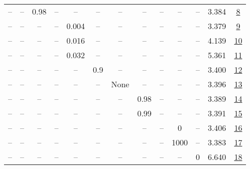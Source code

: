 \begin{table}[H]
\begin{tabular}{ccccccccccccc}
-- & -- & 0.98 & -- & -- & -- & -- & -- & -- & -- & -- & 3.384 & \href{https://wandb.ai/stanford-mercury/optimizer-scaling/runs/sweep-130m-5B-mudamhe3b8b9lr0.008-alr0.008-wd0.2-minlr0-warmup50-489087}{8} \\
-- & -- & -- & -- & 0.004 & -- & -- & -- & -- & -- & -- & 3.379 & \href{https://wandb.ai/stanford-mercury/optimizer-scaling/runs/sweep-130m-5B-mudamhf5aa1clr0.004-alr0.008-wd0.2-minlr0-warmup50-3f0db1}{9} \\
-- & -- & -- & -- & 0.016 & -- & -- & -- & -- & -- & -- & 4.139 & \href{https://wandb.ai/stanford-mercury/optimizer-scaling/runs/sweep-130m-5B-mudamxd71e9blr0.016-alr0.008-wd0.2-minlr0-warmup50-941b3c}{10} \\
-- & -- & -- & -- & 0.032 & -- & -- & -- & -- & -- & -- & 5.361 & \href{https://wandb.ai/stanford-mercury/optimizer-scaling/runs/sweep-130m-5B-mudamh671c15lr0.032-alr0.008-wd0.2-minlr0-warmup50-1b93b8}{11} \\
-- & -- & -- & -- & -- & 0.9 & -- & -- & -- & -- & -- & 3.400 & \href{https://wandb.ai/stanford-mercury/optimizer-scaling/runs/sweep-130m-5B-mudamhec585dlr0.008-alr0.008-wd0.2-minlr0-warmup50-8915fe}{12} \\
-- & -- & -- & -- & -- & -- & None & -- & -- & -- & -- & 3.396 & \href{https://wandb.ai/stanford-mercury/optimizer-scaling/runs/sweep-130m-5B-mudamhfba204lr0.008-alr0.008-wd0.2-minlr0-warmup50-229ac2}{13} \\
-- & -- & -- & -- & -- & -- & -- & 0.98 & -- & -- & -- & 3.389 & \href{https://wandb.ai/stanford-mercury/optimizer-scaling/runs/sweep-130m-5B-mudamh0a566blr0.008-alr0.008-wd0.2-minlr0-warmup50-b33e5a}{14} \\
-- & -- & -- & -- & -- & -- & -- & 0.99 & -- & -- & -- & 3.391 & \href{https://wandb.ai/stanford-mercury/optimizer-scaling/runs/sweep-130m-5B-mudamhdcc541lr0.008-alr0.008-wd0.2-minlr0-warmup50-600a54}{15} \\
-- & -- & -- & -- & -- & -- & -- & -- & -- & 0 & -- & 3.406 & \href{https://wandb.ai/stanford-mercury/optimizer-scaling/runs/sweep-130m-5B-mudamx992d71lr0.008-alr0.008-wd0.2-minlr0-warmup0--2176f5}{16} \\
-- & -- & -- & -- & -- & -- & -- & -- & -- & 1000 & -- & 3.383 & \href{https://wandb.ai/stanford-mercury/optimizer-scaling/runs/sweep-130m-5B-mudamh12b39elr0.008-alr0.008-wd0.2-minlr0-warmup10-bc64dc}{17} \\
-- & -- & -- & -- & -- & -- & -- & -- & -- & -- & 0 & 6.640 & \href{https://wandb.ai/stanford-mercury/optimizer-scaling/runs/sweep-130m-5B-mudamhb0494elr0.008-alr0.008-wd0-minlr0-warmup500--7d74c8}{18} \\

\end{tabular}
\end{table}
